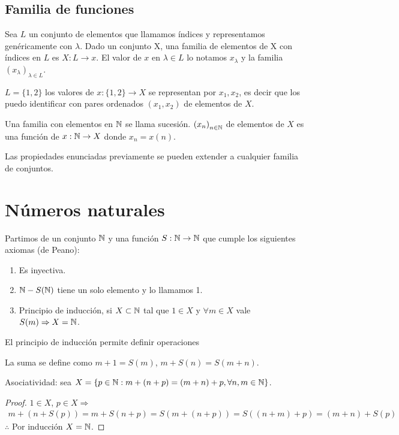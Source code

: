 \subsection{Familia de funciones}

Sea \(L\) un conjunto de elementos que llamamos índices y representamos genéricamente con \(\lambda\). Dado un conjunto X, una familia de elementos de X con índices en \(L\) es \(X: L \to x\).
El valor de \(x\) en \(\lambda \in L\) lo notamos \(x_\lambda \) y la familia \({(x_\lambda)}_{\lambda \in L} \).

\begin{eg}
    \(L = \{ 1, 2 \} \) los valores de \(x: \{1, 2\} \to X\) se representan por \(x_1, x_2\), es decir que los puedo identificar con pares ordenados \((x_1, x_2)\) de elementos de \(X\).
\end{eg}

Una familia con elementos en \(\mathbb{N} \) se llama sucesión. \({(x_n)}_{n \in \mathbb{N}} \) de elementos de \(X\) es una función de \(x: \mathbb{N} \to X\) donde \(x_n = x(n)\).

Las propiedades enunciadas previamente se pueden extender a cualquier familia de conjuntos.

\section{Números naturales}

Partimos de un conjunto \(\mathbb{N} \) y una función \(S: \mathbb{N} \to \mathbb{N} \) que cumple los siguientes axiomas (de Peano):
\begin{enumerate}
    \item Es inyectiva.
    \item \(\mathbb{N} - S(\mathbb{N})\) tiene un solo elemento y lo llamamos 1.
    \item Principio de inducción, si \(X \subset \mathbb{N} \) tal que \(1 \in X\) y \(\forall m \in X\) vale \(S(m) \Rightarrow X = \mathbb{N} \).
\end{enumerate}

El principio de inducción permite definir operaciones

La suma se define como \(m+1 = S(m)\), \(m+S(n) = S(m+n)\).

\begin{prop}
    Asociatividad: sea \(X = \{ p \in \mathbb{N} : m+(n+p) = (m+n) +p, \forall n,m \in \mathbb{N} \} \).
    \begin{proof}
        \(1 \in X\), \(p \in X \Rightarrow \) \begin{align*}
            m + (n+S(p)) = m + S(n+p) = S(m +(n+p)) = S((n+m)+p) = (m+n) + S(p)
        \end{align*}
        \(\therefore \) Por inducción \(X = \mathbb{N} \).
    \end{proof}
\end{prop}



